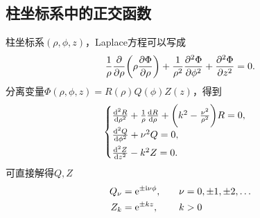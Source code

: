 \subsection{柱坐标系中的正交函数}
柱坐标系$(\rho,\phi,z)$，Laplace方程可以写成
\begin{equation}
    \label{eqn:Laplace in cylinder}
    \frac1\rho\pp\rho\biggkh{\rho\pv\Phi\rho}+\frac1{\rho^2}\pv[2]\Phi\phi+\pv[2]\Phi z=0.
\end{equation}
分离变量$\Phi(\rho,\phi,z)=R(\rho)Q(\phi)Z(z)$，得到 
\[
    \begin{cases}
        \dv[2]R\rho+\frac1\rho\dv R\rho+\biggkh{k^2-\frac{\nu^2}{\rho^2}}R=0,\\[1ex]
        \dv[2]Q\phi+\nu^2Q=0,\\[1ex]
        \dv[2]Zz-k^2Z=0.
    \end{cases}
\]
可直接解得$Q,Z$
\begin{alignat}{2}
    Q_\nu&=\e{\pm\i\nu\phi},\quad&\nu&=0,\pm 1,\pm 2,\ldots\\
    Z_k&=\e{\pm kz},&k&>0
\end{alignat}
